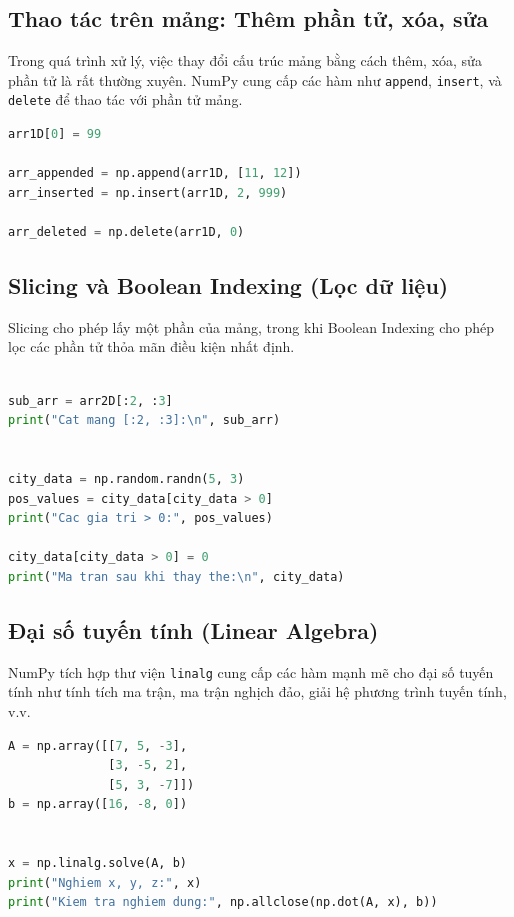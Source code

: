 \subsection{Thao tác trên mảng: Thêm phần tử, xóa, sửa}

Trong quá trình xử lý, việc thay đổi cấu trúc mảng bằng cách thêm, xóa, sửa phần tử là rất thường xuyên. NumPy cung cấp các hàm như \texttt{append}, \texttt{insert}, và \texttt{delete} để thao tác với phần tử mảng.

\begin{lstlisting}[language=Python]
arr1D[0] = 99 

arr_appended = np.append(arr1D, [11, 12]) 
arr_inserted = np.insert(arr1D, 2, 999)  

arr_deleted = np.delete(arr1D, 0)       
\end{lstlisting}

\subsection{Slicing và Boolean Indexing (Lọc dữ liệu)}

Slicing cho phép lấy một phần của mảng, trong khi Boolean Indexing cho phép lọc các phần tử thỏa mãn điều kiện nhất định.

\begin{lstlisting}[language=Python]

sub_arr = arr2D[:2, :3]
print("Cat mang [:2, :3]:\n", sub_arr)


city_data = np.random.randn(5, 3)  
pos_values = city_data[city_data > 0]
print("Cac gia tri > 0:", pos_values)

city_data[city_data > 0] = 0
print("Ma tran sau khi thay the:\n", city_data)
\end{lstlisting}

\subsection{Đại số tuyến tính (Linear Algebra)}

NumPy tích hợp thư viện \texttt{linalg} cung cấp các hàm mạnh mẽ cho đại số tuyến tính như tính tích ma trận, ma trận nghịch đảo, giải hệ phương trình tuyến tính, v.v.

\begin{lstlisting}[language=Python]
A = np.array([[7, 5, -3], 
              [3, -5, 2], 
              [5, 3, -7]])
b = np.array([16, -8, 0])


x = np.linalg.solve(A, b)
print("Nghiem x, y, z:", x)
print("Kiem tra nghiem dung:", np.allclose(np.dot(A, x), b))
\end{lstlisting}


